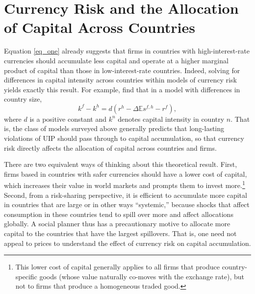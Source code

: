 \documentclass{ar-1col}
\begin{document}
\section{Currency Risk and the Allocation of Capital Across Countries\label{sec_capital}}

Equation \ref{eq_one} already suggests that firms in countries with high-interest-rate currencies should accumulate less capital and operate at a higher marginal product of capital than those in low-interest-rate countries. Indeed, solving for differences in capital intensity across countries within models of currency risk yields exactly this result. For example, \citet{HassanMertensZhang2015} find that in a model with differences in country size,  
\begin{equation}
    k^f - k^h = d
    \left(r^h - \Delta \mathbb{E} s^{f, h} - r^f \right),
\end{equation}
where $d$ is a positive constant and $k^n$ denotes capital intensity in country $n$. That is, the class of models surveyed above generally predicts that long-lasting violations of UIP should pass through to capital accumulation, so that currency risk directly affects the allocation of capital across countries and firms.

There are two equivalent ways of thinking about this theoretical result. First, firms based in countries with safer currencies should have a lower cost of capital, which increases their value in world markets and prompts them to
invest more.\footnote{This lower cost of capital generally applies to all firms that produce country-specific goods (whose value naturally co-moves with the exchange rate), but not to firms that produce a homogeneous traded good.} 
Second, from a risk-sharing perspective, it is efficient to accumulate more capital in countries that are large or in other ways ``systemic,'' because shocks that affect consumption in these countries tend to spill over more and affect allocations globally. A social planner thus has a precautionary motive to allocate more capital to the countries that have the largest spillovers. That is, one need not appeal to prices to understand the effect of currency risk on capital accumulation.

\end{document}

